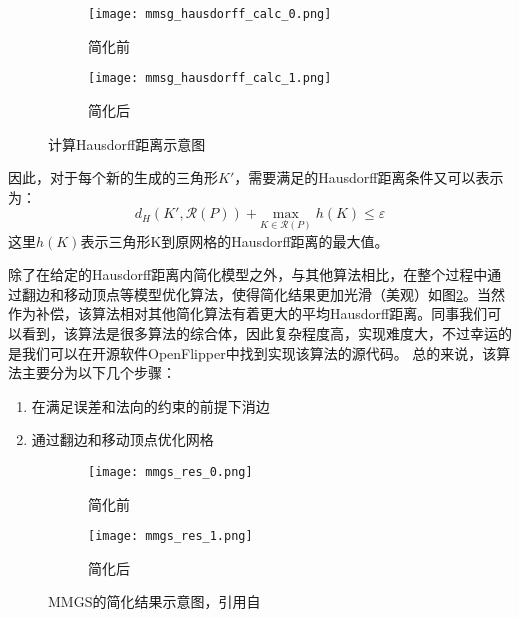 \begin{figure}[htbp]
  \centering
  \begin{subfigure}[b]{0.4\textwidth}
    \texttt{[image: mmsg\_hausdorff\_calc\_0.png]}
    \caption[input]{简化前}
    \end{subfigure}
    \begin{subfigure}[b]{0.4\textwidth}
      \texttt{[image: mmsg\_hausdorff\_calc\_1.png]}
      \caption[mls]{简化后}
    \end{subfigure}
    \caption[MMGS计算Hausdorff距离]{计算Hausdorff距离示意图}
    \label{fig:mmgs-calc-haus}
\end{figure}
因此，对于每个新的生成的三角形$K'$，需要满足的Hausdorff距离条件又可以表示为：
\begin{equation}
  d_H(K',\mathcal{R}(P))+\underset{K\in\mathcal{R}(P)}{\text{max}}\;h(K) \le \varepsilon
\end{equation}
这里$h(K)$表示三角形K到原网格的Hausdorff距离的最大值。\par
除了在给定的Hausdorff距离内简化模型之外，与其他算法相比，在整个过程中通过翻边和移动顶点等模型优化算法，使得简化结果更加光滑（美观）如图\ref{fig:mmgs-res}。当然作为补偿，该算法相对其他简化算法有着更大的平均Hausdorff距离。同事我们可以看到，该算法是很多算法的综合体，因此复杂程度高，实现难度大，不过幸运的是我们可以在开源软件OpenFlipper中找到实现该算法的源代码。
总的来说，该算法主要分为以下几个步骤：
\begin{enumerate}[（1）]
  \item 在满足误差和法向的约束的前提下消边
  \item 通过翻边和移动顶点优化网格
\end{enumerate}
\begin{figure}[htbp]
  \centering
  \begin{subfigure}[b]{0.4\textwidth}
    \texttt{[image: mmgs\_res\_0.png]}
    \caption[input]{简化前}
    \end{subfigure}
    \begin{subfigure}[b]{0.4\textwidth}
      \texttt{[image: mmgs\_res\_1.png]}
      \caption[mls]{简化后}
    \end{subfigure}
    \caption[MMGS简化结果]{MMGS的简化结果示意图，引用自\cite{mmgs}}
    \label{fig:mmgs-res}
\end{figure}

